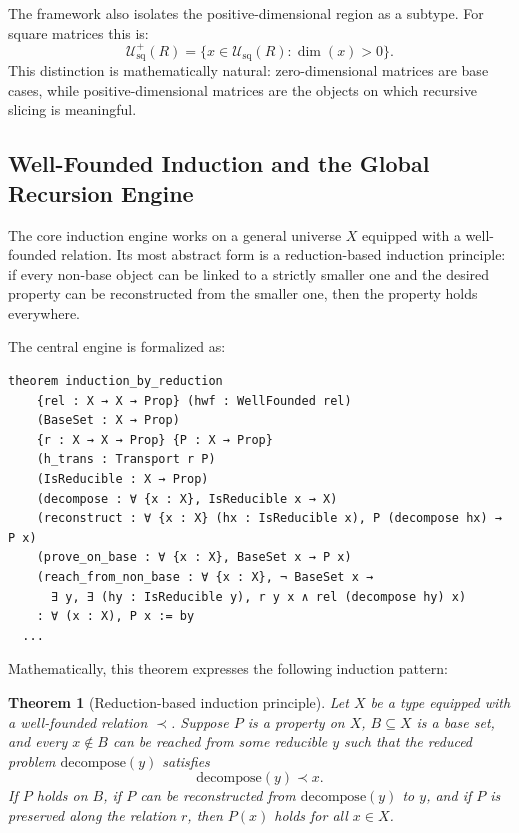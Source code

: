 \documentclass[pdflatex,sn-mathphys-num]{sn-jnl}%
\theoremstyle{thmstyleone}%
\newtheorem{theorem}{Theorem}%
\theoremstyle{thmstyletwo}%
\theoremstyle{thmstylethree}%
\begin{document}
The framework also isolates the positive-dimensional region as a subtype.  For square matrices this is:
\[
\mathcal{U}_{\mathrm{sq}}^{+}(R)
=
\{x\in \mathcal{U}_{\mathrm{sq}}(R) : \dim(x)>0\}.
\]
This distinction is mathematically natural: zero-dimensional matrices are base cases, while positive-dimensional matrices are the objects on which recursive slicing is meaningful.

\subsection{Well-Founded Induction and the Global Recursion Engine}

The core induction engine works on a general universe \(X\) equipped with a well-founded relation.  Its most abstract form is a reduction-based induction principle: if every non-base object can be linked to a strictly smaller one and the desired property can be reconstructed from the smaller one, then the property holds everywhere.

The central engine is formalized as:

\begin{lstlisting}
theorem induction_by_reduction
    {rel : X → X → Prop} (hwf : WellFounded rel)
    (BaseSet : X → Prop)
    {r : X → X → Prop} {P : X → Prop}
    (h_trans : Transport r P)
    (IsReducible : X → Prop)
    (decompose : ∀ {x : X}, IsReducible x → X)
    (reconstruct : ∀ {x : X} (hx : IsReducible x), P (decompose hx) → P x)
    (prove_on_base : ∀ {x : X}, BaseSet x → P x)
    (reach_from_non_base : ∀ {x : X}, ¬ BaseSet x →
      ∃ y, ∃ (hy : IsReducible y), r y x ∧ rel (decompose hy) x)
    : ∀ (x : X), P x := by
  ...
\end{lstlisting}

Mathematically, this theorem expresses the following induction pattern:

\begin{theorem}[Reduction-based induction principle]
Let \(X\) be a type equipped with a well-founded relation \(\prec\).  Suppose \(P\) is a property on \(X\), \(B \subseteq X\) is a base set, and every \(x \notin B\) can be reached from some reducible \(y\) such that the reduced problem \(\mathrm{decompose}(y)\) satisfies
\[
\mathrm{decompose}(y) \prec x.
\]
If \(P\) holds on \(B\), if \(P\) can be reconstructed from \(\mathrm{decompose}(y)\) to \(y\), and if \(P\) is preserved along the relation \(r\), then \(P(x)\) holds for all \(x\in X\).
\end{theorem}
\end{document}
